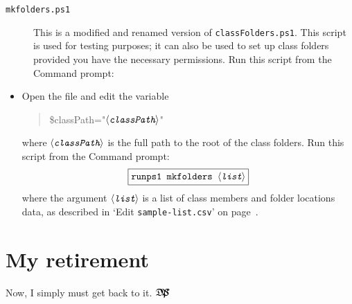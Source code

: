 \documentclass{article}
\let\partSave\part
\def\part#1{\par\addvspace{4ex}\bgroup\let\newpage\relax\partSave{#1}\egroup\addvspace{2ex}}
\def\dps{$\mbox{$\mathfrak D$\kern-.3em\mbox{$\mathfrak P$}%
   \kern-.6em \hbox{$\mathcal S$}}$}
\let\uif\textsf
\def\ameta#1{\ensuremath{\langle\textit{\texttt{#1}}\rangle}}
\begin{document}
\begin{description}
\item[\normalfont\texttt{mkfolders.ps1}] This is a modified and renamed
    version of \texttt{classFolders.ps1}. This script is used for testing
    purposes; it can also be used to set up class folders provided you have
    the necessary permissions. Run this script from the \uif{Command prompt}:
\end{description}
\begin{itemize}
\item[] Open the file and edit the variable
\begin{quote}\ttfamily
\$classPath="\ameta{classPath}"
\end{quote}
where \ameta{classPath} is the full path to the root of the class folders. Run this script
from the \uif{Command prompt}:
\begin{equation*}
    \fbox{\ttfamily runps1 mkfolders \ameta{list}}
\end{equation*}
where the argument \ameta{list} is a list of class members and
    folder locations data, as described in `Edit \texttt{sample-list.csv}'
    on page~\pageref{item:Editlist}.
\end{itemize}

\part{My retirement}

Now, I simply must get back to it. \dps
\end{document}
